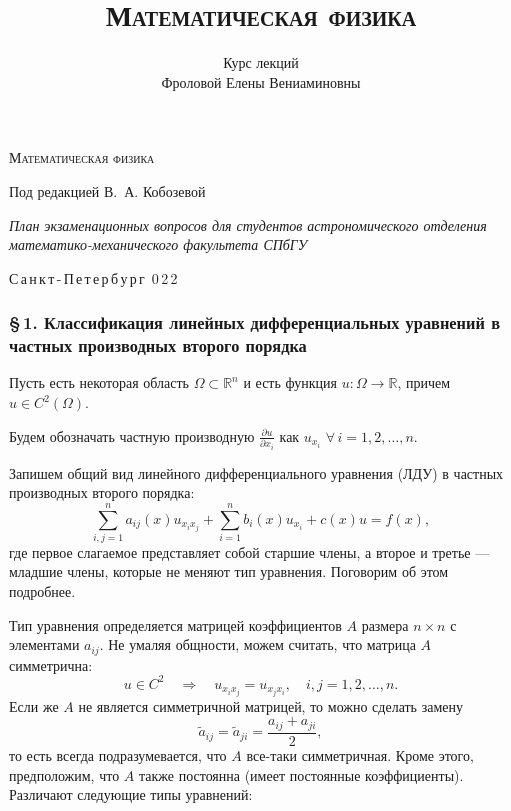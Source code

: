 \documentclass[12pt,a5paper]{book}
\title{\textsc{Математическая физика}}
\author{Курс лекций \\ Фроловой Елены Вениаминовны}
\date{}
\begin{document}
	
	\maketitle
	
	\vspace*{1em}
	\noindent\Large\textsc{Математическая физика}
	
	\vspace*{3em}
	\noindent\normalsize Под редакцией В.~А. Кобозевой
	
	\vspace*{2em}
	\noindent\small\textit{План экзаменационных вопросов для студентов астрономического отделения математико-механического факультета СПбГУ}
	
	\vspace*{27em}
	\noindent\small{С\,а\,н\,к\,т\,-\,П\,е\,т\,е\,р\,б\,у\,р\,г \,0\,2\,2}
	\newpage
	
	
	\subsubsection*{\S\,1. Классификация линейных дифференциальных уравнений в частных производных второго порядка}
	
	Пусть есть некоторая область $\Omega \subset \mathbb{R}^n$ и есть функция $u: \Omega \rightarrow \mathbb{R}$, причем $u \in C^2(\Omega)$.
	
	Будем обозначать частную производную $\frac{\partial u}{\partial x_i}$ как $u_{x_i}$ $\forall\,i = 1, 2, \dots, n$.
	
	Запишем общий вид линейного дифференциального уравнения (ЛДУ) в частных производных второго порядка:
	\begin{equation}\label{LDE}
		\sum_{i,j=1}^{n}{a_{ij}(x)u_{x_ix_j}} + \sum_{i=1}^{n}{b_{i}(x)u_{x_i}} + c(x)u = f(x),
	\end{equation}
	где первое слагаемое представляет собой старшие члены, а второе и третье --- младшие члены, которые не меняют тип уравнения. Поговорим об этом подробнее.
	
	Тип уравнения определяется матрицей коэффициентов $A$ размера $n \times n$ с элементами $a_{ij}$. Не умаляя общности, можем считать, что матрица $A$ симметрична:
	\begin{equation*}
		u \in C^2 \quad \Rightarrow \quad u_{x_ix_j} = u_{x_jx_i}, \quad i,j = 1,2,\dots,n.
	\end{equation*}
	Если же $A$ не является симметричной матрицей, то можно сделать замену
	\begin{equation*}
		\tilde{a}_{ij} = \tilde{a}_{ji} = \frac{a_{ij} + a_{ji}}{2},
	\end{equation*}
	то есть всегда подразумевается, что $A$ все-таки симметричная. Кроме этого, предположим, что $A$ также постоянна (имеет постоянные коэффициенты). Различают следующие типы уравнений:
	
\end{document}
